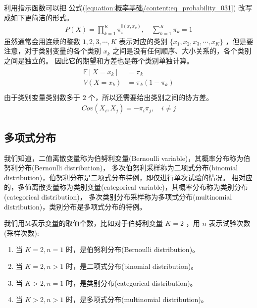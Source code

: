 \documentclass[letterpaper,10pt,english]{sphinxmanual}
\begin{document}
利用指示函数可以把 公式(\ref{equation:概率基础/content:eq_probability_031}) 改写成如下更简洁的形式。
\begin{equation}\label{equation:概率基础/content:概率基础/content:62}
\begin{split}P(X) = \prod_{k=1}^{K} \pi_i^{\mathbb{I} (x,x_k)}, \quad \sum_{k=1}^K \pi_k = 1\end{split}
\end{equation}
虽然通常会用连续的整数 \({1,2,3,\cdots,K}\) 表示对应的类别 \(\{x_1,x_2,x_3,\cdots,x_K\}\)
，但是要注意，对于类别变量的各个类别 \(x_k\) 之间是没有任何顺序、大小关系的，各个类别之间是独立的。
因此它的期望和方差也是每个类别单独计算。
\begin{align}\label{equation:概率基础/content:概率基础/content:63}\!\begin{aligned}
\mathbb{E}[X=x_k] &= \pi_k\\
V(X=x_k) &= \pi_k(1-\pi_k)\\
\end{aligned}\end{align}
由于类别变量类别数多于 \(2\) 个，所以还需要给出类别之间的协方差。
\begin{equation}\label{equation:概率基础/content:概率基础/content:64}
\begin{split}Cov(X_i,X_j) = - \pi_i \pi_j, \quad i \neq j\end{split}
\end{equation}

\subsection{多项式分布}
\label{\detokenize{_u6982_u7387_u57fa_u7840/content:id21}}
我们知道，二值离散变量称为伯努利变量(Bernoulli variable)，其概率分布称为伯努利分布(Bernoulli distribution)，
多次伯努利采样称为二项式分布(binomial distribution)，伯努利分布是二项式分布特例，即仅进行单次试验的情况。
相对应的，多值离散变量称为类别变量(categorical variable)，其概率分布称为类别分布(categorical distribution)，
多次类别分布采样称为多项式分布(multinomial distribution)，类别分布是多项式分布的特例。

我们用M表示变量的取值个数，比如对于伯努利变量 \(K=2\) ，用 \(n\) 表示试验次数(采样次数):
\begin{enumerate}
%
\item {} 
当 \(K=2,n=1\) 时，是伯努利分布(Bernoulli distribution)。

\item {} 
当 \(K=2,n>1\) 时，是二项式分布(binomial distribution)。

\item {} 
当 \(K>2,n=1\) 时，是类别分布(categorical distribution)。

\item {} 
当 \(K>2,n>1\) 时，是多项式分布(multinomial distribution)。

\end{enumerate}
\end{document}
